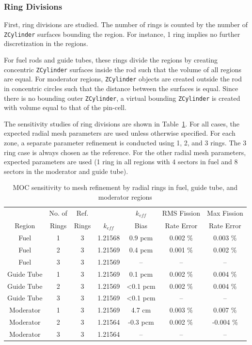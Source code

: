 \subsubsection{Ring Divisions}

First, ring divisions are studied. The number of rings is counted by the number of \texttt{ZCylinder} surfaces bounding the region. For instance, 1 ring implies no further discretization in the regions. 

For fuel rods and guide tubes, these rings divide the regions by creating concentric \texttt{ZCylinder} surfaces inside the rod such that the volume of all regions are equal. For moderator regions, \texttt{ZCylinder} objects are created outside the rod in concentric circles such that the distance between the surfaces is equal. Since there is no bounding outer \texttt{ZCylinder}, a virtual bounding \texttt{ZCylinder} is created with volume equal to that of the pin-cell.

The sensitivity studies of ring divisions are shown in Table~\ref{tab:ring-sensitivity}. For all cases, the expected radial mesh parameters are used unless otherwise specified. For each zone, a separate parameter refinement is conducted using 1, 2, and 3 rings. The 3 ring case is always chosen as the reference. For the other radial mesh parameters, expected parameters are used (1 ring in all regions with 4 sectors in fuel and 8 sectors in the moderator and guide tube).

\begin{table}[ht]
	\centering
	\caption{MOC sensitivity to mesh refinement by radial rings in fuel, guide tube, and moderator regions}
	\medskip
	\begin{tabular}{c|c|c|c|c|c|c}
		\hline
		 & No. of & Ref. & & $k_{\textit{eff}}$ & RMS Fission & Max Fission \\
		Region & Rings  & Rings & $k_{\textit{eff}}$ & Bias & Rate Error & Rate Error \\
		\hline
		Fuel & 1 & 3 & 1.21568 & 0.9 pcm  & 0.002 \% & 0.003 \% \\
		Fuel & 2 & 3 & 1.21569 & 0.4 pcm  & 0.001 \% & 0.002 \% \\
		Fuel & 3 & 3 & 1.21569 & -- & -- & -- \\
		\hline
		\hline
		Guide Tube & 1 & 3 & 1.21569 & 0.1 pcm & 0.002 \% & 0.004 \% \\
		Guide Tube & 2 & 3 & 1.21569 & <0.1 pcm  & 0.002 \% & 0.004 \% \\
		Guide Tube & 3 & 3 & 1.21569 & <0.1 pcm & -- & -- \\
		\hline
		\hline
		Moderator & 1 & 3 & 1.21569 & 4.7 cm  & 0.003 \% & 0.007 \% \\
		Moderator & 2 & 3 & 1.21564 & -0.3 pcm  & 0.002 \% & -0.004 \% \\
		Moderator & 3 & 3 & 1.21564 & -- & -- & -- \\
		\hline
	\end{tabular}
	\label{tab:ring-sensitivity}
\end{table}

